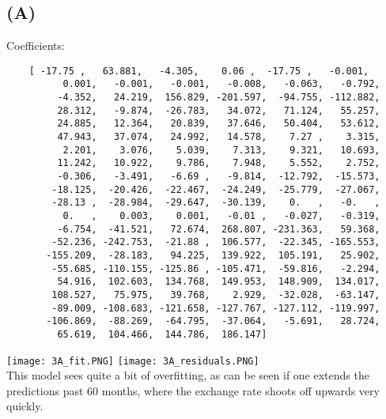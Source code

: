 \documentclass[12pt]{article}
\begin{document}
\subsection*{(A)}
Coefficients:
\begin{verbatim}
    [ -17.75 ,   63.881,   -4.305,    0.06 ,  -17.75 ,   -0.001,
          0.001,   -0.001,   -0.001,   -0.008,   -0.063,   -0.792,
         -4.352,   24.219,  156.829, -201.597,  -94.755, -112.882,
         28.312,   -9.874,  -26.783,   34.072,   71.124,   55.257,
         24.885,   12.364,   20.839,   37.646,   50.404,   53.612,
         47.943,   37.074,   24.992,   14.578,    7.27 ,    3.315,
          2.201,    3.076,    5.039,    7.313,    9.321,   10.693,
         11.242,   10.922,    9.786,    7.948,    5.552,    2.752,
         -0.306,   -3.491,   -6.69 ,   -9.814,  -12.792,  -15.573,
        -18.125,  -20.426,  -22.467,  -24.249,  -25.779,  -27.067,
        -28.13 ,  -28.984,  -29.647,  -30.139,    0.   ,   -0.   ,
          0.   ,    0.003,    0.001,   -0.01 ,   -0.027,   -0.319,
         -6.754,  -41.521,   72.674,  268.807, -231.363,   59.368,
        -52.236, -242.753,  -21.88 ,  106.577,  -22.345, -165.553,
       -155.209,  -28.183,   94.225,  139.922,  105.191,   25.902,
        -55.685, -110.155, -125.86 , -105.471,  -59.816,   -2.294,
         54.916,  102.603,  134.768,  149.953,  148.909,  134.017,
        108.527,   75.975,   39.768,    2.929,  -32.028,  -63.147,
        -89.009, -108.683, -121.658, -127.767, -127.112, -119.997,
       -106.869,  -88.269,  -64.795,  -37.064,   -5.691,   28.724,
         65.619,  104.466,  144.786,  186.147]
\end{verbatim}

\texttt{[image: 3A\_fit.PNG]}
\texttt{[image: 3A\_residuals.PNG]}
\\
This model sees quite a bit of overfitting, as can be seen if one extends the predictions past 60 months, where the exchange rate shoots off upwards very quickly.

\newpage
\end{document}
